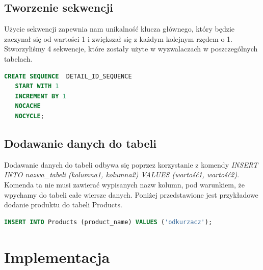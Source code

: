 \documentclass{article}
\begin{document}
\subsection{Tworzenie sekwencji}

Użycie sekwencji zapewnia nam unikalność klucza głównego, który będzie zaczynał
się od wartości 1 i zwiększał się z każdym kolejnym rzędem o 1. Stworzyliśmy 4
sekwencje, które zostały użyte w wyzwalaczach w poszczególnych tabelach.

\begin{lstlisting}[language=SQL,frame=single]
   CREATE SEQUENCE  DETAIL_ID_SEQUENCE 
   START WITH 1
   INCREMENT BY 1
   NOCACHE
   NOCYCLE;
 \end{lstlisting}

\subsection{Dodawanie danych do tabeli}
Dodawanie danych do tabeli odbywa się poprzez korzystanie z komendy
\textit{INSERT INTO nazwa\_tabeli (kolumna1, kolumna2) VALUES
   (wartość1, wartość2)}. Komenda ta nie musi zawierać wypisanych nazw kolumn, pod
warunkiem, że wpychamy do tabeli całe wiersze danych.
Poniżej przedstawione jest przykładowe dodanie produktu do tabeli Products.

\begin{lstlisting}[language=SQL,frame=single]
INSERT INTO Products (product_name) VALUES ('odkurzacz');
 \end{lstlisting}

\section{Implementacja}
\end{document}
